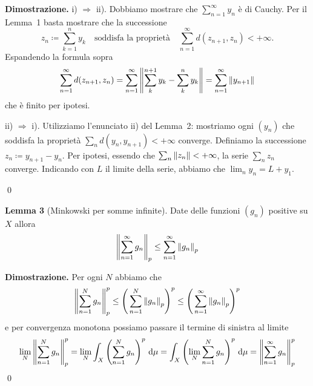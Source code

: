 \textbf{Dimostrazione.} 
i) $\Rightarrow$ ii). Dobbiamo mostrare che $\sum_{n=1}^\infty y_n$ è di Cauchy.
Per il Lemma~1 basta mostrare che la successione
%
$$
	z_n \coloneqq  \sum_{k=1}^n y_k \quad \text{soddisfa la proprietà} \quad
	\sum_{n=1}^\infty d(z_{n+1},z_n) < +\infty.
$$
%
Espandendo la formula sopra
%
$$
	\sum_{n=1}^\infty d(z_{n+1},z_n) = \sum_{n=1}^{\infty} \left\lVert \sum_k^{n+1} y_k - \sum_k^n y_k \right\rVert 
	= \sum_{n=1}^{\infty} \left\lVert y_{n+1} \right\rVert
$$
%
che è finito per ipotesi.

\vs

ii) $\Rightarrow$ i). Utilizziamo l'enunciato ii) del Lemma~2: mostriamo ogni $(y_n)$ che soddisfa la proprietà $\sum_n d(y_n,y_{n+1}) < +\infty$ converge.
Definiamo la successione $z_n \coloneqq y_{n+1} - y_n$. Per ipotesi, essendo che $\sum_n \left\lVert z_n \right\rVert < +\infty$, la serie $\sum_n z_n$ converge.
Indicando con $L$ il limite della serie, abbiamo che $\lim_n y_n = L + y_1$.


\qed

\hypertarget{prop:completeness_lemma_3}{}
\textbf{Lemma 3} 
(Minkowski per somme infinite). 
Date delle funzioni $(g_n)$ positive su $X$ allora
$$
\left\lVert \sum_{n=1}^\infty g_n \right\rVert_p \leq \sum_{n=1}^\infty \left\lVert g_n \right\rVert_p
$$

\textbf{Dimostrazione.}
Per ogni $N$ abbiamo che
$$
\left\lVert \sum_{n=1}^N g_n \right\rVert_p^p 
\leq \left( \,\sum_{n=1}^N \left\lVert g_n \right\rVert_p \right)^p 
\leq \left( \,\sum_{n=1}^\infty \left\lVert g_n \right\rVert_p \right)^p 
$$
e per convergenza monotona possiamo passare il termine di sinistra al limite
$$
\lim_N \left\lVert \sum_{n=1}^N g_n \right\rVert_p^p 
= \lim_N \int_X \left( \sum_{n=1}^N g_n \right)^p \,\mathrm{d} \mu
= \int_X \left( \lim_N \sum_{n=1}^N g_n \right)^p \,\mathrm{d} \mu
= \left\lVert \sum_{n=1}^\infty g_n \right\rVert_p^p
$$
\qed

\newpage

